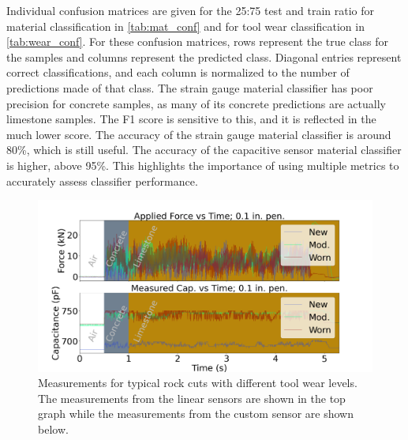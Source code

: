 Individual confusion matrices are given for the 25:75 test and train ratio for 
 material classification in \ref{tab:mat_conf} 
 and for tool wear classification in \ref{tab:wear_conf}.
For these confusion matrices, rows represent the true class for the samples and columns represent the 
 predicted class. Diagonal entries represent correct classifications, 
 and each column is normalized to the number of predictions made of that class.
The strain gauge material classifier has poor precision for concrete samples, 
 as many of its concrete predictions are actually limestone samples. 
The F1 score is sensitive to this, and it is reflected in the much lower score.
The accuracy of the strain gauge material classifier is around 80\%, which 
 is still useful. 
The accuracy of the capacitive sensor material classifier is higher, above 95\%.
This highlights the importance of using multiple metrics to 
 accurately assess classifier performance.

\begin{figure}[t!]
\centering
\centerline{\includegraphics[width=5.5in]{figures/p1_media/Fig7.png}}
\caption{
Measurements for typical rock cuts with different tool wear levels. The measurements from the 
linear sensors are shown in the top graph while the measurements from the custom sensor are shown below.
}
\label{fig:cutforces}
\end{figure}

